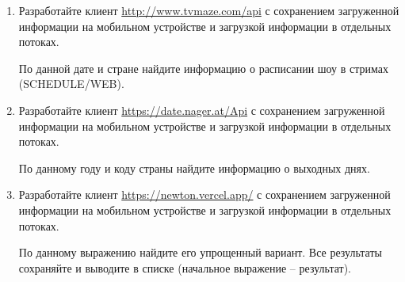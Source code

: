 \begin{enumerate}
		По данной дате и стране найдите информацию о расписании шоу (SCHEDULE).

	\item Разработайте клиент \url{http://www.tvmaze.com/api} с сохранением загруженной информации на мобильном устройстве и загрузкой
		информации в отдельных потоках.

		По данной дате и стране найдите информацию о расписании шоу в стримах (SCHEDULE/WEB).






	\item Разработайте клиент \url{https://date.nager.at/Api} с сохранением загруженной информации на мобильном устройстве и загрузкой
		информации в отдельных потоках. 

		По данному году и коду страны найдите информацию о выходных днях.


	\item Разработайте клиент \url{https://newton.vercel.app/} с сохранением загруженной информации на мобильном устройстве и загрузкой
		информации в отдельных потоках. 

		По данному выражению найдите его упрощенный вариант. Все результаты сохраняйте и выводите в списке (начальное выражение -- результат).





\end{enumerate}
